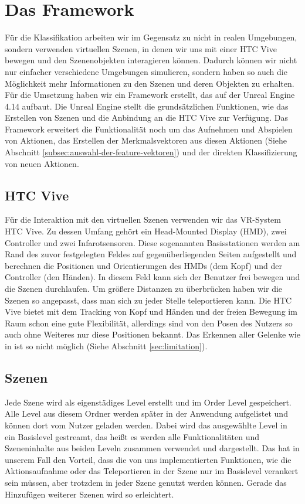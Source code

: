 
\section{Das Framework}

Für die Klassifikation arbeiten wir im Gegensatz zu \cite{scene-grok} nicht in realen Umgebungen, sondern verwenden virtuellen Szenen, in denen wir uns mit einer HTC Vive \cite{htc-vive} bewegen und den Szenenobjekten interagieren können. Dadurch können wir nicht nur einfacher verschiedene Umgebungen simulieren, sondern haben so auch die Möglichkeit mehr Informationen zu den Szenen und deren Objekten zu erhalten.
Für die Umsetzung haben wir ein Framework erstellt, das auf der Unreal Engine 4.14 \cite{ue4} aufbaut. Die Unreal Engine stellt die grundsätzlichen Funktionen, wie das Erstellen von Szenen und die Anbindung an die HTC Vive zur Verfügung. Das Framework erweitert die Funktionalität noch um das Aufnehmen und Abspielen von Aktionen, das Erstellen der Merkmalsvektoren aus diesen Aktionen (Siehe Abschnitt \ref{subsec:auswahl-der-feature-vektoren}) und der direkten Klassifizierung von neuen Aktionen.

\subsection{HTC Vive}
Für die Interaktion mit den virtuellen Szenen verwenden wir das VR-System HTC Vive. Zu dessen Umfang gehört ein Head-Mounted Display (HMD), zwei Controller und zwei Infarotsensoren. Diese sogenannten Basisstationen werden am Rand des zuvor festgelegten Feldes auf gegenüberliegenden Seiten aufgestellt und berechnen die Positionen und Orientierungen des HMDs (dem Kopf) und der Controller (den Händen). In diesem Feld kann sich der Benutzer frei bewegen und die Szenen durchlaufen. Um größere Distanzen zu überbrücken haben wir die Szenen so angepasst, dass man sich zu jeder Stelle teleportieren kann. Die HTC Vive bietet mit dem Tracking von Kopf und Händen und der freien Bewegung im Raum schon eine gute Flexibilität, allerdings sind von den Posen des Nutzers so auch ohne Weiteres nur diese Positionen bekannt. Das Erkennen aller Gelenke wie in \cite{scene-grok} ist so nicht möglich (Siehe Abschnitt \ref{sec:limitation}).

\subsection{Szenen}
Jede Szene wird als eigenstädiges Level erstellt und im Order \glqq{}Level\grqq{} gespeichert. Alle Level aus diesem Ordner werden später in der Anwendung aufgelistet und können dort vom Nutzer geladen werden. Dabei wird das ausgewählte Level in ein Basislevel \glqq{}gestreamt\grqq{}, das heißt es werden alle Funktionalitäten und Szeneninhalte aus beiden Leveln zusammen verwendet und dargestellt. Das hat in unserem Fall den Vorteil, dass die von uns implementierten Funktionen, wie die Aktionsaufnahme oder das Teleportieren in der Szene nur im Basislevel verankert sein müssen, aber trotzdem in jeder Szene genutzt werden können. Gerade das Hinzufügen weiterer Szenen wird so erleichtert.

